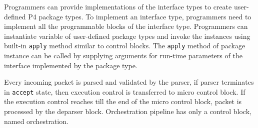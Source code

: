 \documentclass[letterpaper,twocolumn,10pt]{article}
\begin{document}
Programmers can provide implementations of the interface types to create user-defined P4 package types.
To implement an interface type, programmers need to implement all the programmable blocks of the interface type.
Programmers can instantiate variable of user-defined package types and invoke the instances using built-in  \texttt{apply} method similar to control blocks.
The \texttt{apply} method of package instance can be called by supplying arguments for run-time parameters of the interface implemented by the package type.

Every incoming packet is parsed and validated by the parser, if parser terminates in \texttt{accept} state, then execution control is transferred to micro control block.
If the execution control reaches till the end of the micro control block, packet is processed by the deparser block.
Orchestration pipeline has only a control block, named orchestration.
\end{document}

